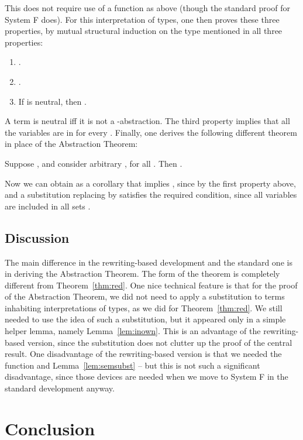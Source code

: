 \documentclass{LMCS}
\begin{document}
\noindent This does not require use of a function  as above
(though the standard proof for System F does).  For this
interpretation of types, one then proves these three properties, by
mutual structural induction on the type  mentioned in all three
properties:

\begin{enumerate}[(1)]
\item .
\item .
\item If  is neutral, then .
\end{enumerate}

\noindent A term is neutral iff it is not a -abstraction.
The third property implies that all the variables are in  for
every .  Finally, one derives the following different theorem in
place of the Abstraction Theorem:

\begin{thm}[Reducibility]
\label{thm:red}
Suppose , and
consider arbitrary , for all .
Then .
\end{thm}

\noindent Now we can obtain as a corollary that 
implies , since  by the first property
above, and a substitution  replacing  by  satisfies the
required condition, since all variables are included in all sets
.

\subsection{Discussion}

The main difference in the rewriting-based development and the
standard one is in deriving the Abstraction Theorem.  The form of the
theorem is completely different from Theorem~\ref{thm:red}.  One nice
technical feature is that for the proof of the Abstraction Theorem, we
did not need to apply a substitution to terms inhabiting
interpretations of types, as we did for Theorem~\ref{thm:red}.  We
still needed to use the idea of such a substitution, but it appeared
only in a simple helper lemma, namely Lemma~\ref{lem:inown}.  This is
an advantage of the rewriting-based version, since the substitution
does not clutter up the proof of the central result.  One disadvantage
of the rewriting-based version is that we needed the function 
and Lemma~\ref{lem:semsubst} -- but this is not such a significant
disadvantage, since those devices are needed when we move to System F
in the standard development anyway.

\section{Conclusion}
\label{sec:conclusion}
\end{document}
